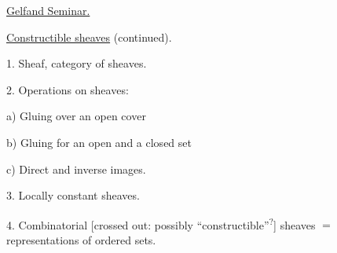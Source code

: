 
\qquad \uline{Gelfand Seminar.}

\qquad
\uline{Constructible sheaves} (continued).


1. Sheaf, category of sheaves.

2. Operations on sheaves:

\hspace*{2em}a) Gluing over an open cover

\hspace*{2em}b) Gluing for an open and a closed set

\hspace*{2em}c) Direct and inverse images.

3. Locally constant sheaves.

4. Combinatorial
[crossed out:
possibly “constructible”\textsuperscript{?}]
sheaves \(=\) representations of ordered sets.

